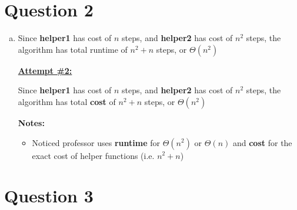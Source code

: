 \documentclass[12pt]{article}
\begin{document}
\section*{Question 2}
\begin{enumerate}[a.]
    \item

    Since \textbf{helper1} has cost of $n$ steps, and \textbf{helper2} has cost of
    $n^2$ steps, the algorithm has total runtime of $n^2 + n$ steps, or $\Theta (n^2)$

    \begin{mdframed}
        \underline{\textbf{Attempt \#2:}}

        \bigskip

        Since \textbf{helper1} has cost of $n$ steps, and \textbf{helper2} has cost of
        $n^2$ steps, the algorithm has total \color{red}\textbf{cost}\color{black}
        \:of $n^2 + n$ steps, or $\Theta (n^2)$

    \end{mdframed}

    \textbf{Notes:}

    \begin{itemize}
     \item Noticed professor uses \textbf{runtime} for $\Theta(n^2)$ or $\Theta(n)$
     and \textbf{cost} for the exact cost of helper functions (i.e. $n^2 + n$)

    \end{itemize}


\end{enumerate}

\section*{Question 3}
\end{document}

